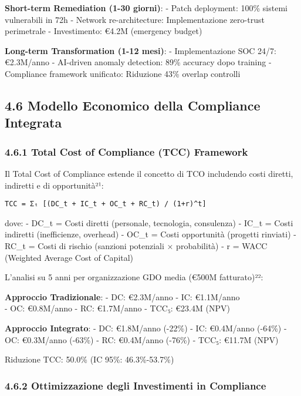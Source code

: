 \documentclass{report}
\begin{document}
\textbf{Short-term Remediation (1-30 giorni)}: - Patch deployment: 100\%
sistemi vulnerabili in 72h - Network re-architecture: Implementazione
zero-trust perimetrale - Investimento: €4.2M (emergency budget)

\textbf{Long-term Transformation (1-12 mesi)}: - Implementazione SOC
24/7: €2.3M/anno - AI-driven anomaly detection: 89\% accuracy dopo
training - Compliance framework unificato: Riduzione 43\% overlap
controlli

\subsection{4.6 Modello Economico della Compliance
Integrata}\label{modello-economico-della-compliance-integrata}

\subsubsection{4.6.1 Total Cost of Compliance (TCC)
Framework}\label{total-cost-of-compliance-tcc-framework}

Il Total Cost of Compliance estende il concetto di TCO includendo costi
diretti, indiretti e di opportunità²¹:

\begin{verbatim}
TCC = Σₜ [(DC_t + IC_t + OC_t + RC_t) / (1+r)^t]
\end{verbatim}

dove: - DC\_t = Costi diretti (personale, tecnologia, consulenza) -
IC\_t = Costi indiretti (inefficienze, overhead) - OC\_t = Costi
opportunità (progetti rinviati) - RC\_t = Costi di rischio (sanzioni
potenziali × probabilità) - r = WACC (Weighted Average Cost of Capital)

L'analisi su 5 anni per organizzazione GDO media (€500M fatturato)²²:

\textbf{Approccio Tradizionale}: - DC: €2.3M/anno - IC: €1.1M/anno\\
- OC: €0.8M/anno - RC: €1.7M/anno - TCC₅: €23.4M (NPV)

\textbf{Approccio Integrato}: - DC: €1.8M/anno (-22\%) - IC: €0.4M/anno
(-64\%) - OC: €0.3M/anno (-63\%) - RC: €0.4M/anno (-76\%) - TCC₅: €11.7M
(NPV)

Riduzione TCC: 50.0\% (IC 95\%: 46.3\%-53.7\%)

\subsubsection{4.6.2 Ottimizzazione degli Investimenti in
Compliance}\label{ottimizzazione-degli-investimenti-in-compliance}
\end{document}
